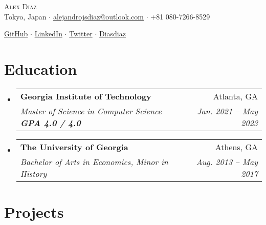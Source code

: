 \documentclass[12pt, letter]{article}
\makeatletter
\newcommand{\resumeSubheading}[4]{
  \vspace{-2pt}\item
    \begin{tabular*}{0.97\textwidth}[t]{l@{\extracolsep{\fill}}r}
      \textbf{#1} & #2 \\
      \textit{\small#3} & \textit{\small #4} \\
    \end{tabular*}\vspace{-7pt}
}
\newcommand{\resumeSubHeadingListStart}{\begin{itemize}[leftmargin=0.15in, label={}]}
\newcommand{\resumeSubHeadingListEnd}{\end{itemize}}
\makeatother
\begin{document}
    

\vspace*{-14pt}
\begin{center}
	{\Huge \scshape {Alex Diaz}}\\
	\vspace{1mm}
	\faMapMarker \hspace{.5mm} Tokyo, Japan $\cdot$ 
	\faEnvelope \hspace{.5mm} \href{mailto:alejandrojsdiaz@outlook.com}{alejandrojsdiaz@outlook.com} $\cdot$ \faMobile \hspace{.5mm} +81 080-7266-8529
		
	\faGithub \hspace{.5mm} \href{https://github.com/calmcoconut}{GitHub} $\cdot$
	\faLinkedin \hspace{.5mm} \href{https://www.linkedin.com/in/diazjalejandro/}{LinkedIn} $\cdot$
	\faTwitter \hspace{.5mm} \href{https://twitter.com/greetingsfriend}{Twitter} $\cdot$
    \faBriefcase \hspace{.5mm} \href{https://calmcoconut.github.io/diasDiaz/}{Diasdiaz}
    \\
\end{center}

\vspace{-14pt}
\section{Education}
  \resumeSubHeadingListStart
    \resumeSubheading
      {Georgia Institute of Technology}{Atlanta, GA}
      {Master of Science in Computer Science \textbf{GPA 4.0 / 4.0}}{Jan. 2021 -- May 2023}
    \resumeSubheading
      {The University of Georgia}{Athens, GA}
      {Bachelor of Arts in Economics, Minor in History}{Aug. 2013 -- May 2017}
 \resumeSubHeadingListEnd

\section{Projects}
\end{document}

